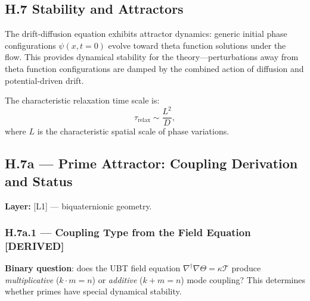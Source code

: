 \subsection*{H.7 Stability and Attractors}

The drift-diffusion equation exhibits attractor dynamics: generic initial phase configurations $\psi(x,t=0)$ evolve toward theta function solutions under the flow. This provides dynamical stability for the theory—perturbations away from theta function configurations are damped by the combined action of diffusion and potential-driven drift.

The characteristic relaxation time scale is:
\begin{equation}
\tau_{\text{relax}} \sim \frac{L^2}{D},
\end{equation}
where $L$ is the characteristic spatial scale of phase variations.

\subsection*{H.7a — Prime Attractor: Coupling Derivation and Status}

\textbf{Layer:} [L1] — biquaternionic geometry.


\subsubsection*{H.7a.1 — Coupling Type from the Field Equation  \textbf{[DERIVED]}}

\textbf{Binary question}: does the UBT field equation $\nabla^\dagger\nabla\Theta = \kappa\mathcal{T}$
produce \emph{multiplicative} ($k \cdot m = n$) or \emph{additive} ($k + m = n$)
mode coupling?  This determines whether primes have special dynamical stability.

